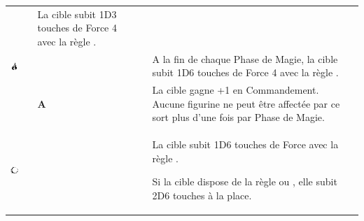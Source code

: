 \begin{center}
\begin{tabular}{>{\bf}M{1.75cm}>{\raggedright}m{2.1cm}M{1cm}M{1.9cm}M{1.5cm}m{7cm}}
\missile{} \newline
\damage{} &
\instant{} &
La cible subit 1D3 touches de Force 4 avec la règle \flamingattacks{}.
\tabularnewline
{} \includegraphics[width=1cm]{pics/fire.png} &
\firespellone{} &
\newline
{} &
 \newline
{} \newline
\hex{} &
\remainsinplay{} &
A la fin de chaque Phase de Magie, la cible subit 1D6 touches de Force 4 avec la règle \flamingattacks{}.
\tabularnewline
\hline
{} \lightTOC{} &
\lightattribute{} &
\textbf{A} &
 \newline
\augment{} &
\lastsoneturn{} &
La cible gagne +1 en Commandement. Aucune figurine ne peut être affectée par ce sort plus d'une fois par Phase de Magie.
\tabularnewline
{} \includegraphics[width=1cm]{pics/light.png} &
\lightsignature{} &
\newline
{} &
 \newline
{} \newline
\hex{} \newline
\missile{} \newline
\damage{} &
\instant{} &
La cible subit 1D6 touches de Force   avec la règle \flamingattacks{}.

\vspace*{5pt}
Si la cible dispose de la règle \otherworldly{} ou \undead{}, elle subit 2D6 touches à la place.
\tabularnewline
\end{tabular}
\end{center}



\newpage

